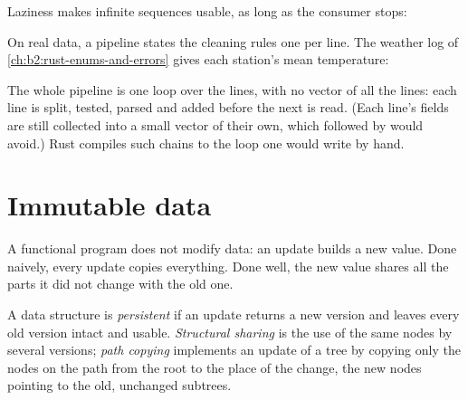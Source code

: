Laziness makes infinite sequences usable, as long as the consumer stops:

\label{lst:b2:functional-programming:infinite}

\label{out:b2:functional-programming:infinite}

On real data, a pipeline states the cleaning rules one per line. The weather log of
\cref{ch:b2:rust-enums-and-errors} gives each station's mean temperature:

\label{lst:b2:functional-programming:pipeline}

\label{out:b2:functional-programming:pipeline}

The whole pipeline is one loop over the lines, with no vector of all the lines: each line is split, tested, parsed
and added before the next is read. (Each line's fields are still collected into a small vector of their own, which
 followed by  would avoid.) Rust compiles such chains to the loop one would write by hand.

\section{Immutable data}\label{sec:b2:functional-programming:persistent}

A functional program does not modify data: an update builds a new value. Done naively, every update copies
everything. Done well, the new value shares all the parts it did not change with the old one.

\begin{definition}\label{def:b2:functional-programming:persistent}
A data structure is \emph{persistent} if an update returns a new version and leaves
every old version intact and usable. \emph{Structural sharing} is the use of the same
nodes by several versions; \emph{path copying} implements an update of a tree by copying only the
nodes on the path from the root to the place of the change, the new nodes pointing to the old, unchanged subtrees.
\end{definition}

